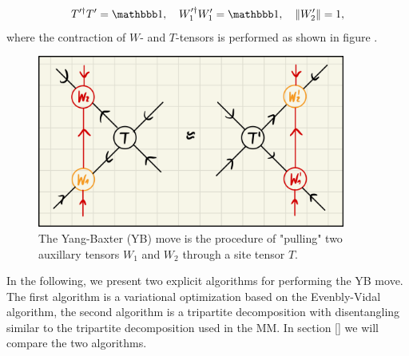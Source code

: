\begin{equation}
	T^{\prime\dagger}T^\prime = \id, \quad W_1^{\prime\dagger}W_1^\prime = \id, \quad \left\lVert W_2^\prime \right\rVert = 1,
\end{equation}
where the contraction of $W$- and $T$-tensors is performed as shown in figure \figref{}. \par
\begin{figure}
	\centering
	\includegraphics[width=0.9\textwidth]{figures/Tensor_Networks/YB_move_closeup.jpeg}
	\caption{The Yang-Baxter (YB) move is the procedure of "pulling" two auxillary tensors $W_1$ and $W_2$ through a site tensor $T$.}
	\label{fig:disoTPS_YB_move_closeup}
\end{figure}
In the following, we present two explicit algorithms for performing the YB move. The first algorithm is a variational optimization based on the Evenbly-Vidal algorithm, the second algorithm is a tripartite decomposition with disentangling similar to the tripartite decomposition used in the MM. In section \ref{} we will compare the two algorithms.